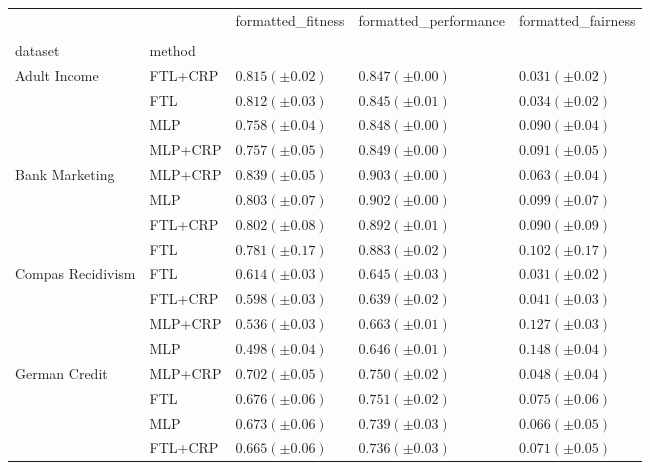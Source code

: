 \begin{tabular}{lllll}
\toprule
 &  & formatted_fitness & formatted_performance & formatted_fairness \\
 &  &  &  &  \\
dataset & method &  &  &  \\
\midrule
\multirow[t]{4}{*}{Adult Income} & FTL+CRP & $0.815 (\pm0.02)$ & $0.847 (\pm0.00)$ & $0.031 (\pm0.02)$ \\
 & FTL & $0.812 (\pm0.03)$ & $0.845 (\pm0.01)$ & $0.034 (\pm0.02)$ \\
 & MLP & $0.758 (\pm0.04)$ & $0.848 (\pm0.00)$ & $0.090 (\pm0.04)$ \\
 & MLP+CRP & $0.757 (\pm0.05)$ & $0.849 (\pm0.00)$ & $0.091 (\pm0.05)$ \\
\cline{1-5}
\multirow[t]{4}{*}{Bank Marketing} & MLP+CRP & $0.839 (\pm0.05)$ & $0.903 (\pm0.00)$ & $0.063 (\pm0.04)$ \\
 & MLP & $0.803 (\pm0.07)$ & $0.902 (\pm0.00)$ & $0.099 (\pm0.07)$ \\
 & FTL+CRP & $0.802 (\pm0.08)$ & $0.892 (\pm0.01)$ & $0.090 (\pm0.09)$ \\
 & FTL & $0.781 (\pm0.17)$ & $0.883 (\pm0.02)$ & $0.102 (\pm0.17)$ \\
\cline{1-5}
\multirow[t]{4}{*}{Compas Recidivism} & FTL & $0.614 (\pm0.03)$ & $0.645 (\pm0.03)$ & $0.031 (\pm0.02)$ \\
 & FTL+CRP & $0.598 (\pm0.03)$ & $0.639 (\pm0.02)$ & $0.041 (\pm0.03)$ \\
 & MLP+CRP & $0.536 (\pm0.03)$ & $0.663 (\pm0.01)$ & $0.127 (\pm0.03)$ \\
 & MLP & $0.498 (\pm0.04)$ & $0.646 (\pm0.01)$ & $0.148 (\pm0.04)$ \\
\cline{1-5}
\multirow[t]{4}{*}{German Credit} & MLP+CRP & $0.702 (\pm0.05)$ & $0.750 (\pm0.02)$ & $0.048 (\pm0.04)$ \\
 & FTL & $0.676 (\pm0.06)$ & $0.751 (\pm0.02)$ & $0.075 (\pm0.06)$ \\
 & MLP & $0.673 (\pm0.06)$ & $0.739 (\pm0.03)$ & $0.066 (\pm0.05)$ \\
 & FTL+CRP & $0.665 (\pm0.06)$ & $0.736 (\pm0.03)$ & $0.071 (\pm0.05)$ \\
\cline{1-5}
\bottomrule
\end{tabular}

